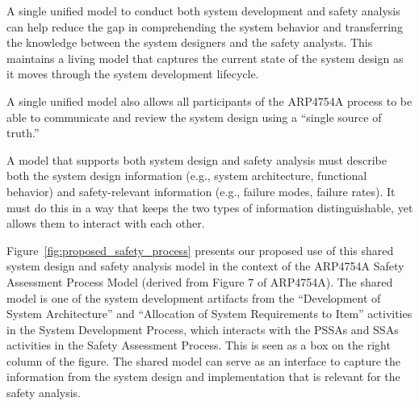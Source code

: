 A single unified model to conduct both system development and safety analysis can help reduce the gap in comprehending the system behavior and transferring the knowledge between the system designers and the safety analysts. This maintains a living model that captures the current state of the system design as it moves through the system development lifecycle.

A single unified model also allows all participants of the ARP4754A process to be able to communicate and review the system design using a ``single source of truth.''

A model that supports both system design and safety analysis must describe both the system design information (e.g., system architecture, functional behavior) and safety-relevant information (e.g., failure modes, failure rates).  It must do this in a way that keeps the two types of information distinguishable, yet allows them to interact with each other.

Figure~\ref{fig:proposed_safety_process} presents our proposed use of this shared system design and safety analysis model in the context of the ARP4754A Safety Assessment Process Model (derived from Figure 7 of ARP4754A). The shared model is one of the system development artifacts from the ``Development of System Architecture'' and ``Allocation of System Requirements to Item'' activities in the System Development Process, which interacts with the PSSAs and SSAs activities in the Safety Assessment Process. This is seen as a box on the right column of the figure. The shared model can serve as an interface to capture the information from the system design and implementation that is relevant for the safety analysis.


